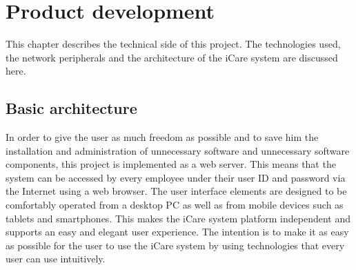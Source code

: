 \chapter{Product development}
This chapter describes the technical side of this project. The technologies used, the network peripherals and the architecture of the iCare system are discussed here.
\section{Basic architecture}
In order to give the user as much freedom as possible and to save him the installation and administration of unnecessary software and unnecessary software components, this project is implemented as a web server. This means that the system can be accessed by every employee under their user ID and password via the Internet using a web browser. The user interface elements are designed to be comfortably operated from a desktop PC as well as from mobile devices such as tablets and smartphones. This makes the iCare system platform independent and supports an easy and elegant user experience. The intention is to make it as easy as possible for the user to use the iCare system by using technologies that every user can use intuitively.

